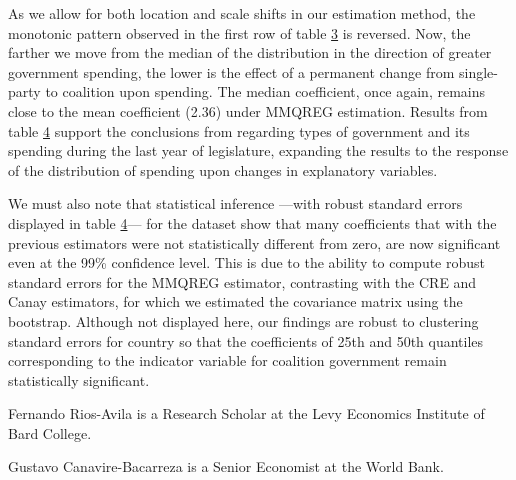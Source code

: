 \documentclass[bib]{statapress}
\begin{document}
\label{tab:mmqreg_results}{}

As we allow for both location and scale shifts in our estimation method,
the monotonic pattern observed in the first row of table
\hyperref[tab:mcanay_results]{3} is reversed. Now, the farther we move
from the median of the distribution in the direction of greater
government spending, the lower is the effect of a permanent change from
single-party to coalition upon spending. The median coefficient, once
again, remains close to the mean coefficient (2.36) under MMQREG
estimation. Results from table \hyperref[tab:mmqreg_results]{4} support
the conclusions from \citep{persson2007} regarding types of government
and its spending during the last year of legislature, expanding the
results to the response of the distribution of spending upon changes in
explanatory variables.

We must also note that statistical inference ---with robust standard
errors displayed in table \hyperref[tab:mmqreg_results]{4}--- for the
\citep{persson2007} dataset show that many coefficients that with the
previous estimators were not statistically different from zero, are now
significant even at the 99\% confidence level. This is due to the
ability to compute robust standard errors for the MMQREG estimator,
contrasting with the CRE and Canay estimators, for which we estimated
the covariance matrix using the bootstrap. Although not displayed here,
our findings are robust to clustering standard errors for country so
that the coefficients of 25th and 50th quantiles corresponding to the
indicator variable for coalition government remain statistically
significant.

\clearpage





\begin{aboutauthors}

Fernando Rios-Avila is a Research Scholar at the Levy Economics
Institute of Bard College.

Gustavo Canavire-Bacarreza is a Senior Economist at the World Bank.

\end{aboutauthors}
\end{document}
